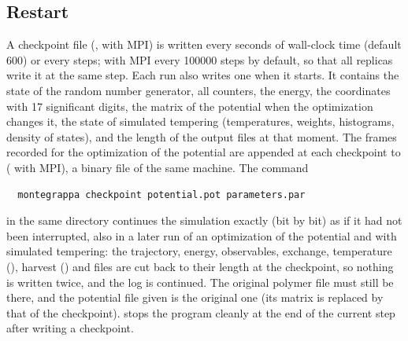 \documentclass[11pt,a4paper]{article}
\begin{document}
\subsection{Restart}
A checkpoint file (, 
with MPI) is written every  seconds of wall-clock time
(default 600) or every  steps; with MPI every 100000 steps
by default, so that all replicas write it at the same step. Each run also
writes one when it starts. It contains the state of the random number
generator, all counters, the energy, the coordinates with 17 significant
digits, the matrix of the potential when the optimization changes it, the
state of simulated tempering (temperatures, weights, histograms, density of
states), and the length of the output files at that moment. The frames
recorded for the optimization of the potential are appended at each
checkpoint to  (
with MPI), a binary file of the same machine. The command
\begin{Verbatim}
  montegrappa checkpoint potential.pot parameters.par
\end{Verbatim}
in the same directory continues the simulation exactly (bit by bit) as if
it had not been interrupted, also in a later run of an optimization of the
potential and with simulated tempering: the trajectory, energy,
observables, exchange, temperature (), harvest
() and  files are cut back to their length at
the checkpoint, so nothing is written twice, and the log is continued. The
original polymer file must still be there, and the potential file given is
the original one (its matrix is replaced by that of the checkpoint).
 stops the program cleanly at the end of the current step
after writing a checkpoint.
\end{document}
